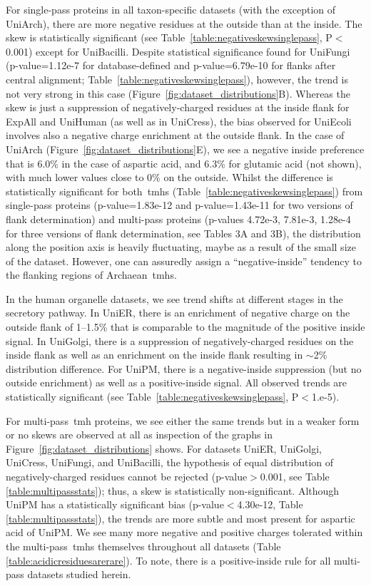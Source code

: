 For single\--pass proteins in all taxon-specific datasets (with the exception of UniArch), there are more negative residues at the outside than at the inside.
The skew is statistically significant (see Table~\ref{table:negativeskewsinglepass}, P$<$0.001) except for UniBacilli.
Despite statistical significance found for UniFungi (p\--value=1.12e-7 for database-defined and p\--value=6.79e-10 for flanks after central alignment; Table~\ref{table:negativeskewsinglepass}), however, the trend is not very strong in this case (Figure~\ref{fig:dataset_distributions}B).
Whereas the skew is just a suppression of negatively\--charged residues at the inside flank for ExpAll and UniHuman (as well as in UniCress), the bias observed for UniEcoli involves also a negative charge enrichment at the outside flank.
In the case of UniArch (Figure~\ref{fig:dataset_distributions}E), we see a negative inside preference that is 6.0\% in the case of aspartic acid, and 6.3\% for glutamic acid (not shown), with much lower values close to 0\% on the outside.
Whilst the difference is statistically significant for both~\gls{tmh}s (Table~\ref{table:negativeskewsinglepass}) from single\--pass proteins (p\--value=1.83e-12 and p\--value=1.43e-11 for two versions of flank determination) and multi\--pass proteins (p\--values 4.72e-3, 7.81e-3, 1.28e-4 for three versions of flank determination, see Tables 3A and 3B), the distribution along the position axis is heavily fluctuating, maybe as a result of the small size of the dataset.
However, one can assuredly assign a ``negative-inside'' tendency to the flanking regions of Archaean~\gls{tmh}s.

In the human organelle datasets, we see trend shifts at different stages in the secretory pathway.
In UniER, there is an enrichment of negative charge on the outside flank of 1--1.5\% that is comparable to the magnitude of the positive inside signal.
In UniGolgi, there is a suppression of negatively\--charged residues on the inside flank as well as an enrichment on the inside flank resulting in \(\sim\)2\% distribution difference.
For UniPM, there is a negative-inside suppression (but no outside enrichment) as well as a positive-inside signal.
All observed trends are statistically significant (see Table~\ref{table:negativeskewsinglepass}, P$<$1.e-5).

For multi\--pass~\gls{tmh} proteins, we see either the same trends but in a weaker form or no skews are observed at all as inspection of the graphs in Figure~\ref{fig:dataset_distributions} shows.
For datasets UniER, UniGolgi, UniCress, UniFungi, and UniBacilli, the hypothesis of equal distribution of negatively\--charged residues cannot be rejected (p\--value$>$0.001, see Table \ref{table:multipassstats}); thus, a skew is statistically non-significant.
Although UniPM has a statistically significant bias (p\--value$<$4.30e-12, Table \ref{table:multipassstats}), the trends are more subtle and most present for aspartic acid of UniPM\@.
We see many more negative and positive charges tolerated within the multi\--pass~\gls{tmh}s themselves throughout all datasets (Table \ref{table:acidicresiduesarerare}).
To note, there is a positive-inside rule for all multi\--pass datasets studied herein.

